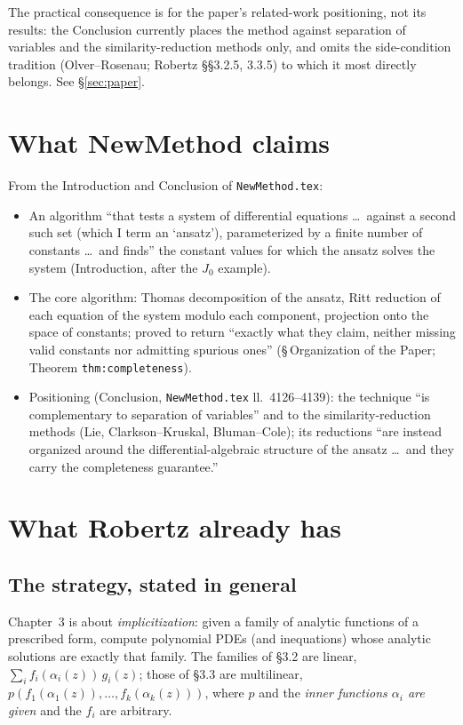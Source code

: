 \documentclass[11pt]{article}
\newcommand{\code}[1]{\texttt{#1}}
\begin{document}
\noindent
The practical consequence is for the paper's related-work positioning, not
its results: the Conclusion currently places the method against separation
of variables and the similarity-reduction methods only, and omits the
side-condition tradition (Olver--Rosenau; Robertz \S\S3.2.5, 3.3.5) to which
it most directly belongs. See \S\ref{sec:paper}.

\section{What NewMethod claims}

From the Introduction and Conclusion of \code{NewMethod.tex}:
\begin{itemize}
\item An algorithm ``that tests a system of differential equations \dots\
  against a second such set (which I term an `ansatz'), parameterized by a
  finite number of constants \dots\ and finds'' the constant values for which
  the ansatz solves the system (Introduction, after the $J_0$ example).
\item The core algorithm: Thomas decomposition of the ansatz, Ritt reduction
  of each equation of the system modulo each component, projection onto the
  space of constants; proved to return ``exactly what they claim, neither
  missing valid constants nor admitting spurious ones''
  (\S\,Organization of the Paper; Theorem \verb|thm:completeness|).
\item Positioning (Conclusion, \code{NewMethod.tex} ll.~4126--4139): the
  technique ``is complementary to separation of variables'' and to the
  similarity-reduction methods (Lie, Clarkson--Kruskal, Bluman--Cole); its
  reductions ``are instead organized around the differential-algebraic
  structure of the ansatz \dots\ and they carry the completeness guarantee.''
\end{itemize}

\section{What Robertz already has}

\subsection{The strategy, stated in general}

Chapter~3 is about \emph{implicitization}: given a family of analytic
functions of a prescribed form, compute polynomial PDEs (and inequations)
whose analytic solutions are exactly that family. The families of \S3.2 are
linear, $\sum_i f_i(\alpha_i(z))\,g_i(z)$; those of \S3.3 are multilinear,
$p(f_1(\alpha_1(z)),\dots,f_k(\alpha_k(z)))$, where $p$ and the
\emph{inner functions $\alpha_i$ are given} and the $f_i$ are arbitrary.
\end{document}
